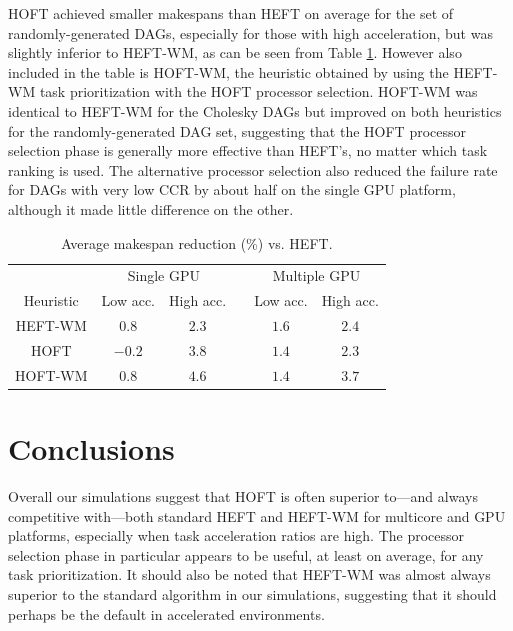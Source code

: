 \documentclass[runningheads]{llncs}
\begin{document}
HOFT achieved smaller makespans than HEFT on average for the set of randomly-generated DAGs, especially for those with high acceleration, but was slightly inferior to HEFT-WM, as can be seen from Table \ref{tb.hoft_random_DAGs}. However also included in the table is HOFT-WM, the heuristic obtained by using the HEFT-WM task prioritization with the HOFT processor selection. HOFT-WM was identical to HEFT-WM for the Cholesky DAGs but improved on both heuristics for the randomly-generated DAG set, suggesting that the HOFT processor selection phase is generally more effective than HEFT's, no matter which task ranking is used. The alternative processor selection also reduced the failure rate for DAGs with very low CCR by about half on the single GPU platform, although it made little difference on the other.     


\begin{table}
	\caption{Average makespan reduction (\%) vs. HEFT.} 
	\begin{center}	
		\begin{tabular}{c c c c c c}
			\toprule
			& \multicolumn{2}{c}{Single GPU} && \multicolumn{2}{c}{Multiple GPU}\\
			\cmidrule{2-3} \cmidrule{5-6}
			Heuristic & Low acc. & High acc. && Low acc. & High acc.\\
			\cmidrule{1-6}
			HEFT-WM & $0.8$ & $2.3$ && $1.6$ & $2.4$ \\
			HOFT & $-0.2$ & $3.8$ && $1.4$ & $2.3$\\
			HOFT-WM & $0.8$ & $4.6$ && $1.4$ & $3.7$\\ 
			\bottomrule			
		\end{tabular}
		\label{tb.hoft_random_DAGs}
	\end{center}	
\end{table}

  


\section{Conclusions}
\label{sect.conclusion}

Overall our simulations suggest that HOFT is often superior to---and always competitive with---both standard HEFT and HEFT-WM for multicore and GPU platforms, especially when task acceleration ratios are high. The processor selection phase in particular appears to be useful, at least on average, for any task prioritization. It should also be noted that HEFT-WM was almost always superior to the standard algorithm in our simulations, suggesting that it should perhaps be the default in accelerated environments. 
\end{document}
